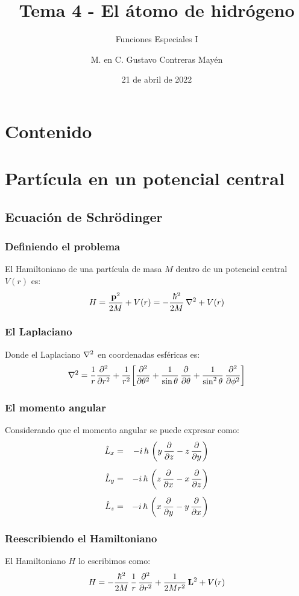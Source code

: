 \documentclass[12pt]{beamer}
\date{21 de abril de 2022}
\title{\large{Tema 4 - El átomo de hidrógeno}}
\subtitle{Funciones Especiales I}
\author{M. en C. Gustavo Contreras Mayén}
\begin{document}
\maketitle
\fontsize{14}{14}\selectfont
{}

\section*{Contenido}


\section{Partícula en un potencial central}
\subsection{Ecuación de Schrödinger}


\begin{frame}
\frametitle{Definiendo el problema}
El Hamiltoniano de una partícula de masa $M$ dentro de un potencial central $V (r)$ es:
\pause
\begin{align}
H = \dfrac{\vb{p}^{2}}{2 M} + V (r) = - \dfrac{\hbar^{2}}{2 M} \, \laplacian + V (r)
\label{eq:ecuacion_08_01}
\end{align}
\end{frame}
\begin{frame}
\frametitle{El Laplaciano}
Donde el Laplaciano $\laplacian$ en coordenadas esféricas es:
\pause
\begin{align}
\laplacian = \dfrac{1}{r} \pdv[2]{r} + \dfrac{1}{r^{2}} \bigg[ \pdv[2]{\theta} + \dfrac{1}{\sin \theta} \, \pdv{\theta} + \dfrac{1}{\sin^{2} \theta} \, \pdv[2]{\phi} \bigg]
\label{eq:ecuacion_08_02}
\end{align}
\end{frame}
\begin{frame}
\frametitle{El momento angular}
Considerando que el momento angular se puede expresar como:
\pause
\begin{align}
\begin{aligned}
\hat{L}_{x} &=& - i \, \hbar \, \left( y \, \pdv{z} - z \, \pdv{y} \right) \\[0.5em] 
\hat{L}_{y} &=& - i \, \hbar \, \left( z \, \pdv{x} - x \, \pdv{z} \right) \\[0.5em] 
\hat{L}_{z} &=& - i \, \hbar \, \left( x \, \pdv{y} - y \, \pdv{x} \right)
\end{aligned}
\label{eq:ecuacion_01_03a}
\end{align}
\end{frame}
\begin{frame}
\frametitle{Reescribiendo el Hamiltoniano}
El Hamiltoniano $H$ lo escribimos como:
\pause
\begin{align}
H = - \dfrac{\hbar^{2}}{2 M} \, \dfrac{1}{r} \, \pdv[2]{r} + \dfrac{1}{2 M r^{2}} \, \vb{L}^{2} + V (r)
\label{eq:ecuacion_08_03}
\end{align}
\end{frame}
\end{document}

